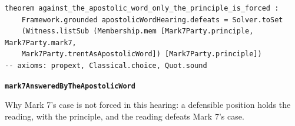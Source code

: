 \documentclass[11pt]{article}
\begin{document}
{\small\begin{verbatim}
theorem against_the_apostolic_word_only_the_principle_is_forced :
    Framework.grounded apostolicWordHearing.defeats = Solver.toSet
    (Witness.listSub (Membership.mem [Mark7Party.principle, Mark7Party.mark7,
    Mark7Party.trentAsApostolicWord]) [Mark7Party.principle])
-- axioms: propext, Classical.choice, Quot.sound
\end{verbatim}}
\par\medskip\noindent\textbf{\texttt{mark7\allowbreak{}Answered\allowbreak{}By\allowbreak{}The\allowbreak{}Apostolic\allowbreak{}Word}}\par\nobreak\noindent
Why Mark 7’s case is not forced in this hearing: a defensible position holds the reading, with the principle, and the reading defeats Mark 7’s case.
\end{document}

